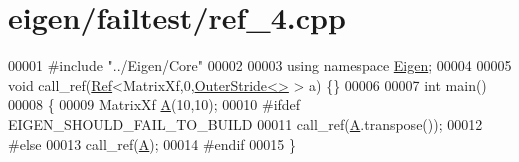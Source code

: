 \hypertarget{eigen_2failtest_2ref__4_8cpp_source}{}\section{eigen/failtest/ref\+\_\+4.cpp}
\label{eigen_2failtest_2ref__4_8cpp_source}

\begin{DoxyCode}
00001 \textcolor{preprocessor}{#include "../Eigen/Core"}
00002 
00003 \textcolor{keyword}{using namespace }\hyperlink{namespace_eigen}{Eigen};
00004 
00005 \textcolor{keywordtype}{void} call\_ref(\hyperlink{group___core___module_class_eigen_1_1_ref}{Ref}<MatrixXf,0,\hyperlink{class_eigen_1_1_outer_stride}{OuterStride<>} > a) \{\}
00006 
00007 \textcolor{keywordtype}{int} main()
00008 \{
00009   MatrixXf \hyperlink{group___core___module_class_eigen_1_1_matrix}{A}(10,10);
00010 \textcolor{preprocessor}{#ifdef EIGEN\_SHOULD\_FAIL\_TO\_BUILD}
00011   call\_ref(\hyperlink{group___core___module_class_eigen_1_1_matrix}{A}.transpose());
00012 \textcolor{preprocessor}{#else}
00013   call\_ref(\hyperlink{group___core___module_class_eigen_1_1_matrix}{A});
00014 \textcolor{preprocessor}{#endif}
00015 \}
\end{DoxyCode}
